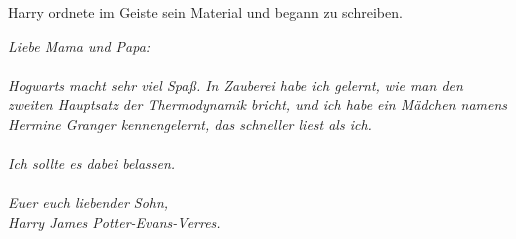 Harry ordnete im Geiste sein Material und begann zu schreiben.

\emph{Liebe Mama und Papa:\\~\\
Hogwarts macht sehr viel Spaß. In Zauberei habe ich gelernt, wie man den zweiten
Hauptsatz der Thermodynamik bricht, und ich habe ein Mädchen namens Hermine
Granger kennengelernt, das schneller liest als ich.\\~\\
Ich sollte es dabei belassen.\\~\\
Euer euch liebender Sohn,\\
Harry James Potter-Evans-Verres.}

